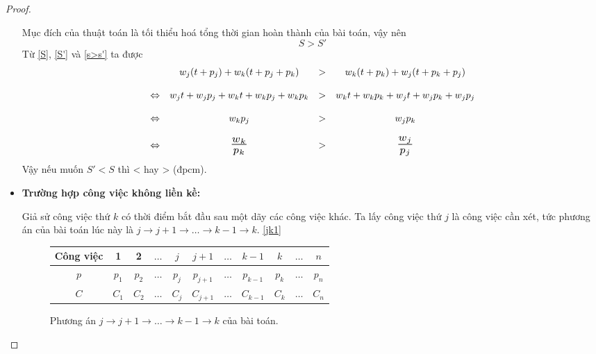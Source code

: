 \documentclass[12pt,a4paper]{report}
\begin{document}
\begin{proof}
\begin{itemize}
	Mục đích của thuật toán là tối thiểu hoá tổng thời gian hoàn thành của bài toán, vậy nên
	\begin{equation} \label{s>s'}
		S > S'
	\end{equation}
	Từ \eqref{S}, \eqref{S'} và \eqref{s>s'} ta được
        \begin{equation*}
        \begin{array}{c c c c}
		& w_j(t+p_j) + w_k(t+p_j+p_k) &>& w_k(t+p_k) + w_j(t+p_k+p_j) \\
		\\
		\Leftrightarrow & w_jt + w_jp_j + w_kt + w_k p_j + w_kp_k &>& w_k t + w_k p_k + w_j t + w_j p_k + w_j p_j \\
		\\
		\Leftrightarrow & w_k p_j &>& w_j p_k \\
		\\
		\Leftrightarrow & \scalebox{1.5}{$\frac{w_k}{p_k}$} &>& \scalebox{1.5}{$\frac{w_j}{p_j}$} \\
        \end{array}
        \end{equation*}
		Vậy nếu muốn $S'<S$ thì  <  hay  >  (đpcm).

\phantom{text}

\item \textbf{Trường hợp công việc không liền kề:}

Giả sử công việc thứ $k$ có thời điểm bắt đầu sau một dãy các công việc khác. Ta lấy công việc thứ $j$ là công việc cần xét, tức phương án của bài toán lúc này là $j \rightarrow j+1 \rightarrow \ldots \rightarrow k-1 \rightarrow k$. \eqref{jk1}

\begin{figure}[h!]
	\centering
	 \begin{tabular}{|c | c c c c c c c c c c |} 
	 \hline
	 Công việc & 1 & 2 & $\ldots$ & $j$ & $j+1$ & $\ldots$ & $k-1$ & $k$ & $\ldots$ & $n$ \\
	 \hline\hline
	 $p$ & $p_1$ & $p_2$ & $\ldots$ & $p_j$ & $p_{j+1}$ & $\ldots$ & $p_{k-1}$ & $p_k$ & $\ldots$ & $p_n$ \\
	 $C$ & $C_1$ & $C_2$ & $\ldots$ & $C_j$ & $C_{j+1}$ & $\ldots$ & $C_{k-1}$ & $C_k$ & $\ldots$ & $C_n$ \\
	 \hline
	 \end{tabular}
\caption{\label{jk1}Phương án $j \rightarrow j+1 \rightarrow \ldots \rightarrow k-1 \rightarrow k$ của bài toán.}
\end{figure}


\end{itemize}
\end{proof}
\end{document}
